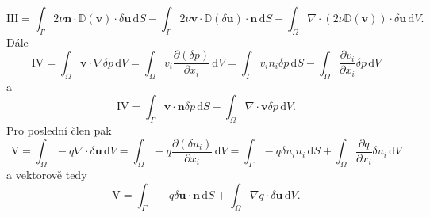 \begin{equation}\label{eq:clen_III}
\mathrm{III}
=
\int_{\Gamma} 
2\nu \mathbf{n} \cdot  \mathbb{D}(\mathbf{v})\cdot \delta \mathbf{u}
\, \mathrm{d}S
- \int_{\Gamma} 
2\nu \mathbf{v} \cdot  \mathbb{D}(\delta \mathbf{u})\cdot \mathbf{n}
\, \mathrm{d}S
-
\int_{\Omega} 
\nabla \cdot \left( 2\nu \mathbb{D}(\mathbf{v}) \right) \cdot \delta \mathbf{u}
\, \mathrm{d}V.
\end{equation}
Dále
\begin{equation}
\mathrm{IV}
=
\int_{\Omega} 
\mathbf{v} \cdot \nabla \delta p
\, \mathrm{d}V
=
\int_{\Omega} 
v_i \frac{\partial (\delta p) }{\partial x_i}
\, \mathrm{d}V
=
\int_{\Gamma} 
v_i n_i \delta p 
\, \mathrm{d}S
-
\int_{\Omega} 
 \frac{\partial v_i }{\partial x_i} \delta p
\, \mathrm{d}V
\end{equation}
a 
\begin{equation}\label{eq:clen_IV}
\mathrm{IV}
=
\int_{\Gamma} 
\mathbf{v}\cdot \mathbf{n} \delta p 
\, \mathrm{d}S
-
\int_{\Omega} 
\nabla \cdot \mathbf{v} \delta p
\, \mathrm{d}V.
\end{equation}
Pro poslední člen pak
\begin{equation*}
\mathrm{V}
=
\int_{\Omega} 
- q \nabla \cdot \delta \mathbf{u}
\, \mathrm{d}V
=
\int_{\Omega} 
- q \frac{\partial (\delta u_i)}{\partial x_i}
\, \mathrm{d}V
= 
\int_{\Gamma} 
- q \delta u_i n_i
\, \mathrm{d}S
+
\int_{\Omega} 
 \frac{\partial q}{\partial x_i} \delta u_i
\, \mathrm{d}V
\end{equation*}
a vektorově tedy
\begin{equation}\label{eq:clen_V}
\mathrm{V}
=
\int_{\Gamma} 
- q \delta \mathbf{u \cdot n}
\, \mathrm{d}S
+
\int_{\Omega} 
\nabla q \cdot \delta \mathbf{u}
\, \mathrm{d}V.
\end{equation}

